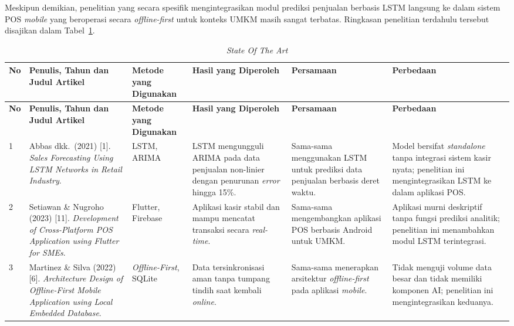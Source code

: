 \documentclass[12pt, a4paper, onecolumn, oneside]{report}
\begin{document}
\begin{spacing}{1.5}
Meskipun demikian, penelitian yang secara spesifik mengintegrasikan modul prediksi penjualan berbasis LSTM langsung ke dalam sistem POS \textit{mobile} yang beroperasi secara \textit{offline-first} untuk konteks UMKM masih sangat terbatas. Ringkasan penelitian terdahulu tersebut disajikan dalam Tabel~\ref{tab:sota}.

\setlength{\tabcolsep}{4pt}
{\small{}
\begin{longtable}{|>{\centering\arraybackslash}p{0.4cm}|>{\raggedright\arraybackslash}p{2.5cm}|>{\raggedright\arraybackslash}p{1.5cm}|>{\raggedright\arraybackslash}p{2.0cm}|>{\raggedright\arraybackslash}p{2.0cm}|>{\raggedright\arraybackslash}p{2.8cm}|}

\caption{\textit{State Of The Art}} \label{tab:sota} \\
\hline
\textbf{No} &
\textbf{Penulis, Tahun dan Judul Artikel} &
\textbf{Metode yang Digunakan} &
\textbf{Hasil yang Diperoleh} &
\textbf{Persamaan} &
\textbf{Perbedaan} \\
\hline
\endfirsthead

\hline
\textbf{No} &
\textbf{Penulis, Tahun dan Judul Artikel} &
\textbf{Metode yang Digunakan} &
\textbf{Hasil yang Diperoleh} &
\textbf{Persamaan} &
\textbf{Perbedaan} \\
\hline
\endhead

\hline
\endfoot

\hline
\endlastfoot

1 &
Abbas dkk.~(2021) [1]. \textit{Sales Forecasting Using LSTM Networks in Retail Industry}. &
LSTM, ARIMA &
LSTM mengungguli ARIMA pada data penjualan non-linier dengan penurunan \textit{error} hingga 15\%. &
Sama-sama menggunakan LSTM untuk prediksi data penjualan berbasis deret waktu. &
Model bersifat \textit{standalone} tanpa integrasi sistem kasir nyata; penelitian ini mengintegrasikan LSTM ke dalam aplikasi POS. \\
\hline

2 &
Setiawan \& Nugroho (2023) [11]. \textit{Development of Cross-Platform POS Application using Flutter for SMEs}. &
Flutter, Firebase &
Aplikasi kasir stabil dan mampu mencatat transaksi secara \textit{real-time}. &
Sama-sama mengembangkan aplikasi POS berbasis Android untuk UMKM. &
Aplikasi murni deskriptif tanpa fungsi prediksi analitik; penelitian ini menambahkan modul LSTM terintegrasi. \\
\hline

3 &
Martinez \& Silva (2022) [6]. \textit{Architecture Design of Offline-First Mobile Application using Local Embedded Database}. &
\textit{Offline-First}, SQLite &
Data tersinkronisasi aman tanpa tumpang tindih saat kembali \textit{online}. &
Sama-sama menerapkan arsitektur \textit{offline-first} pada aplikasi \textit{mobile}. &
Tidak menguji volume data besar dan tidak memiliki komponen AI; penelitian ini mengintegrasikan keduanya. \\
\hline


\end{longtable}}
\end{spacing}
\end{document}
